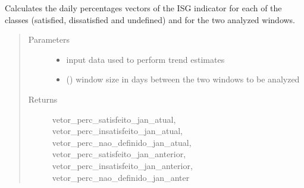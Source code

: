 \documentclass[letterpaper,10pt,english]{sphinxmanual}
\begin{document}
\begin{fulllineitems}
\label{\detokenize{algorithms:algorithms.eti.eti.calc_vector_perc_daily_isg}}
\sphinxAtStartPar
Calculates the daily percentages vectors of the ISG indicator for each of the classes (satisfied, dissatisfied and
undefined) and for the two analyzed windows.
\begin{quote}\begin{description}
\item[{Parameters}] \leavevmode\begin{itemize}
\item {} 
\sphinxAtStartPar
{} \textendash{} input data used to perform trend estimates

\item {} 
\sphinxAtStartPar
{} () \textendash{} window size in days between the two windows to be analyzed

\end{itemize}

\item[{Returns}] \leavevmode
\sphinxAtStartPar
vetor\_perc\_satisfeito\_jan\_atual, vetor\_perc\_insatisfeito\_jan\_atual, vetor\_perc\_nao\_definido\_jan\_atual,
vetor\_perc\_satisfeito\_jan\_anterior, vetor\_perc\_insatisfeito\_jan\_anterior, vetor\_perc\_nao\_definido\_jan\_anter

\end{description}\end{quote}

\end{fulllineitems}


\sphinxAtStartPar
{}

\label{\detokenize{algorithms:module-algorithms.eti.eti_utils}}
\end{document}
